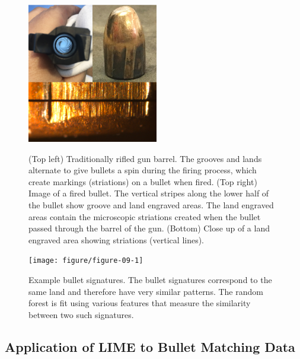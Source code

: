 \documentclass[AMS,STIX2COL]{WileyNJD-v2}\usepackage[]{graphicx}\usepackage[]{color}
\newenvironment{knitrout}{}{} %
\begin{document}
\begin{figure}[!t]
\centering
\begin{knitrout}
\color{fgcolor}

{\centering \includegraphics[width=2.25in]{figure-static/figure-08-1} 

}



\end{knitrout}
\caption{(Top left) Traditionally rifled gun barrel. The grooves and lands alternate to give bullets a spin during the firing process, which create markings (striations) on a bullet when fired. (Top right) Image of a fired bullet. The vertical stripes along the lower half of the bullet show groove and land engraved areas. The land engraved areas contain the microscopic striations created when the bullet passed through the barrel of the gun. (Bottom) Close up of a land engraved area showing striations (vertical lines).}
\label{fig:figure-08}

\vspace*{\floatsep}

\begin{knitrout}
\color{fgcolor}

{\centering \texttt{[image: figure/figure-09-1]} 

}



\end{knitrout}
\caption{Example bullet signatures. The bullet signatures correspond to the same land and therefore have very similar patterns. The \citet{hare:2017} random forest is fit using various features that measure the similarity between two such signatures.}
\label{fig:figure-09}
\end{figure}

\subsection{Application of LIME to Bullet Matching Data}
\end{document}
